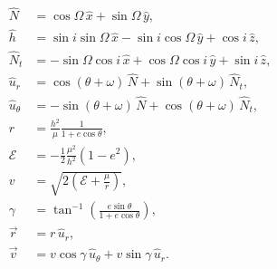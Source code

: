 \documentclass[10pt]{article}
\newcommand{\parenth}[1]{\ensuremath{\left( #1 \right)}}
\theoremstyle{plain}\theorembodyfont{\normalfont}
\begin{document}
\begin{align*}
\hat N & = \cos\Omega\, \hat x + \sin\Omega\, \hat y,\\
\hat h & = \sin i \sin\Omega \,\hat x - \sin i \cos\Omega \,\hat y + \cos i \,\hat z,\\
\hat N_t & = -\sin\Omega\cos i \,\hat x +\cos\Omega \cos i \,\hat y + \sin i \,\hat z,\\
\hat u_r & = \cos(\theta+\omega) \,\hat N + \sin(\theta+\omega) \,\hat N_t,\\
\hat u_\theta & = -\sin(\theta+\omega) \,\hat N + \cos(\theta+\omega)\, \hat N_t,\\
r & = \frac{h^2}{\mu} \frac{1}{1+e\cos\theta},\\
\mathcal{E} & = -\frac{1}{2}\frac{\mu^2}{h^2} (1-e^2),\\
v & = \sqrt{2\parenth{\mathcal{E} + \frac{\mu}{r}}},\\
\gamma & = \tan^{-1} \parenth{\frac{e\sin\theta}{1+e\cos\theta}},\\
\vec r & = r \,\hat u_r,\\
\vec v & = v \cos\gamma \,\hat u_\theta + v\sin\gamma \,\hat u_r.
\end{align*}
\end{document}
